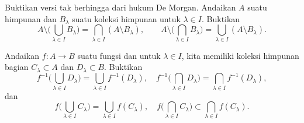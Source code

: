 \begin{exercise}
Buktikan versi tak berhingga dari hukum De Morgan.
Andaikan $A$ suatu himpunan dan $B_\lambda$ suatu koleksi himpunan untuk $\lambda
\in I$.  Buktikan
\begin{equation*}
A \setminus \biggl(
\bigcup_{\lambda \in I} B_\lambda
\biggr)
=
\bigcap_{\lambda \in I}
(
A \setminus
B_\lambda
) ,
\qquad
A \setminus \biggl(
\bigcap_{\lambda \in I} B_\lambda
\biggr)
=
\bigcup_{\lambda \in I}
(
A \setminus
B_\lambda
) .
\end{equation*}
\end{exercise}

\begin{exercise}
Andaikan $f \colon A \to B$ suatu fungsi dan untuk $\lambda \in I$, kita memiliki
koleksi himpunan bagian $C_\lambda \subset A$ dan
$D_\lambda \subset B$.  Buktikan
\begin{equation*}
f^{-1} \biggl(
\bigcup_{\lambda \in I} D_\lambda
\biggr)
=
\bigcup_{\lambda \in I}
f^{-1}(D_\lambda) ,
\quad
f^{-1} \biggl(
\bigcap_{\lambda \in I} D_\lambda
\biggr)
=
\bigcap_{\lambda \in I}
f^{-1}(D_\lambda) ,
\end{equation*}
dan
\begin{equation*}
f \biggl(
\bigcup_{\lambda \in I} C_\lambda
\biggr)
=
\bigcup_{\lambda \in I}
f(C_\lambda) ,
\quad
f \biggl(
\bigcap_{\lambda \in I} C_\lambda
\biggr)
\subset
\bigcap_{\lambda \in I}
f(C_\lambda) .
\end{equation*}
\end{exercise}
